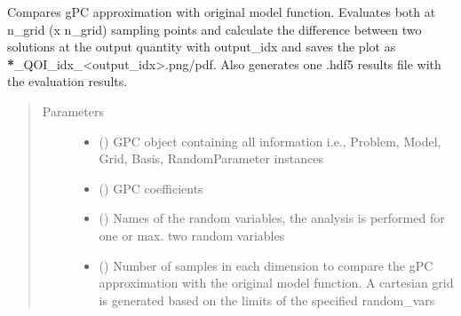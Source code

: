 \documentclass[letterpaper,10pt,english,openany,oneside]{sphinxmanual}
\begin{document}
\begin{fulllineitems}
\label{\detokenize{pygpc:pygpc.validation.validate_gpc_plot}}
Compares gPC approximation with original model function. Evaluates both at n\_grid (x n\_grid) sampling points and
calculate the difference between two solutions at the output quantity with output\_idx and saves the plot as
{\color{red}\bfseries{}*}\_QOI\_idx\_\textless{}output\_idx\textgreater{}.png/pdf. Also generates one .hdf5 results file with the evaluation results.
\begin{quote}\begin{description}
\item[{Parameters}] \leavevmode\begin{itemize}
\item {} 
 () \textendash{} GPC object containing all information i.e., Problem, Model, Grid, Basis, RandomParameter instances

\item {} 
 (\sphinxstyleliteralemphasis{\sphinxupquote{ {[}}}\sphinxstyleliteralemphasis{\sphinxupquote{{]}}}) \textendash{} GPC coefficients

\item {} 
 (\sphinxstyleliteralemphasis{\sphinxupquote{ {[}}}\sphinxstyleliteralemphasis{\sphinxupquote{{]}}}) \textendash{} Names of the random variables, the analysis is performed for one or max. two random variables

\item {} 
 (\sphinxstyleliteralemphasis{\sphinxupquote{ {[}}}\sphinxstyleliteralemphasis{\sphinxupquote{{]}}}\sphinxstyleliteralemphasis{\sphinxupquote{, }}) \textendash{} Number of samples in each dimension to compare the gPC approximation with the original model function.
A cartesian grid is generated based on the limits of the specified random\_vars


\end{itemize}
\end{description}
\end{quote}
\end{fulllineitems}
\end{document}
